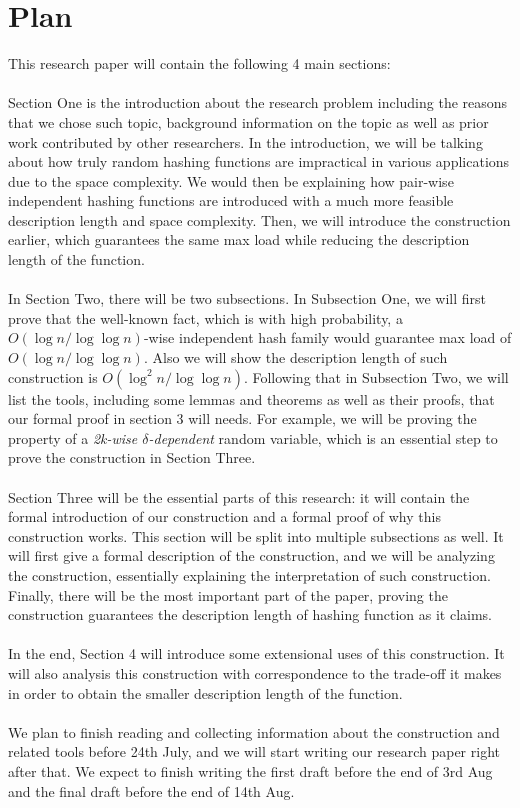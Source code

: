\documentclass[letterpaper]{article} %
\begin{document}
	\newpage
	\section{Plan}
	This research paper will contain the following 4 main sections: \\\\
	Section One is the introduction about the research problem including the reasons that we chose such topic, background information on the topic as well as prior work contributed by other researchers. In the introduction, we will be talking about how truly random hashing functions are impractical in various applications due to the space complexity. We would then be explaining how pair-wise independent hashing functions are introduced with a much more feasible description length and space complexity. Then, we will introduce the construction earlier, which guarantees the same max load while reducing the description length of the function. \\\\
	In Section Two, there will be two subsections. In Subsection One, we will first prove that the well-known fact, which is with high probability, a $O(\log n/\log\log n)$-wise independent hash family would guarantee max load of $O(\log n/\log\log n)$. Also we will show the description length of such construction is $O(\log^2 n/\log\log n)$. Following that in Subsection Two, we will list the tools, including some lemmas and theorems as well as their proofs, that our formal proof in section 3 will needs. For example, we will be proving the property of a \textit{2k-wise $\delta$-dependent} random variable, which is an essential step to prove the construction in Section Three.
\\\\	Section Three will be the essential parts of this research: it will contain the formal introduction of our construction and a formal proof of why this construction works. This section will be split into multiple subsections as well. It will first give a formal description of the construction, and we will be analyzing the construction, essentially explaining the interpretation of such construction. Finally, there will be the most important part of the paper, proving the construction guarantees the description length of hashing function as it claims.
\\\\ 	In the end, Section 4 will introduce some extensional uses of this construction. It will also analysis this construction with correspondence to the trade-off it makes in order to obtain the smaller description length of the function. \\\\
	We plan to finish reading and collecting information about the construction and related tools before 24th July, and we will start writing our research paper right after that. We expect to finish writing the first draft before the end of 3rd Aug and the final draft before the end of 14th Aug.
	
\end{document}
